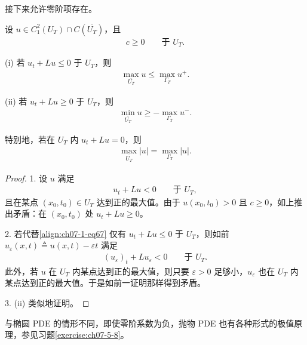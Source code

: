 \documentclass[../../main.tex]{subfiles}
\begin{document}
接下来允许零阶项存在。

\begin{theorem}\label{theorem:ch07-1-c非负弱极值原理}设 $u\in C^2_1(U_T)\cap C(\overline{U_T})$，且
\begin{align*}
c\geqslant 0\qquad \text{于 } U_T.
\end{align*}

(i) 若 $u_t+Lu\leqslant 0$ 于 $U_T$，则
\begin{align*}
\max_{\overline{U_T}} u \leqslant \max_{\Gamma_T} u^+.
\end{align*}

(ii) 若 $u_t+Lu\geqslant 0$ 于 $U_T$，则
\begin{align*}
\min_{\overline{U_T}} u \geqslant -\max_{\Gamma_T} u^-.
\end{align*}
\end{theorem}

\begin{remark}\label{remark:ch07-1-齐次方程绝对值极值}
特别地，若在 $U_T$ 内 $u_t+Lu=0$，则
\begin{align*}
\max_{\overline{U_T}}|u| = \max_{\Gamma_T}|u|.
\end{align*}
\end{remark}

\begin{proof}
1. 设 $u$ 满足
\begin{align}
u_t+Lu<0\qquad \text{于 } U_T,\label{align:ch07-1-eq67}
\end{align}
且在某点 $(x_0,t_0)\in U_T$ 达到正的最大值。由于 $u(x_0,t_0)>0$ 且 $c\geqslant 0$，如上推出矛盾：在 $(x_0,t_0)$ 处 $u_t+Lu\geqslant 0$。

2. 若代替\eqref{align:ch07-1-eq67} 仅有 $u_t+Lu\leqslant 0$ 于 $U_T$，则如前 $u_\varepsilon(x,t)\triangleq u(x,t)-\varepsilon t$ 满足
\begin{align*}
(u_\varepsilon)_t+Lu_\varepsilon<0\qquad \text{于 } U_T.
\end{align*}
此外，若 $u$ 在 $U_T$ 内某点达到正的最大值，则只要 $\varepsilon>0$ 足够小，$u_\varepsilon$ 也在 $U_T$ 内某点达到正的最大值。于是如前一证明那样得到矛盾。

3. (ii) 类似地证明。
\end{proof}

\begin{remark}\label{remark:ch07-1-负零阶系数}
与椭圆 PDE 的情形不同，即使零阶系数为负，抛物 PDE 也有各种形式的极值原理，参见习题\cref{exercise:ch07-5-8}。
\end{remark}
\end{document}
